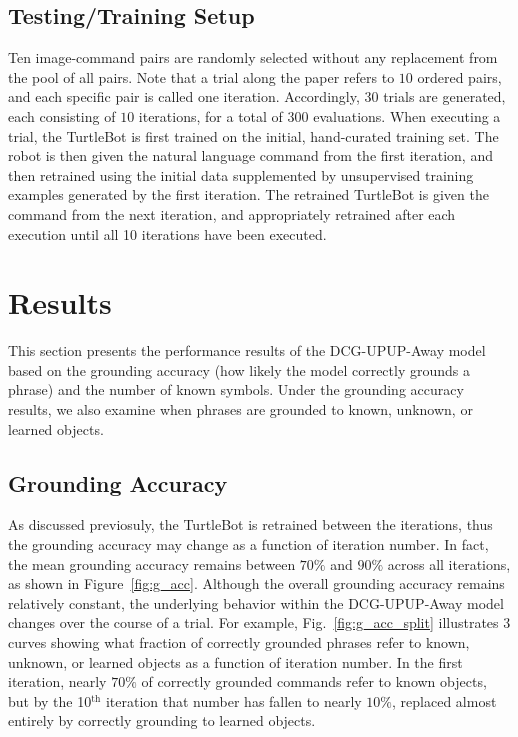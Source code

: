 \subsection{Testing/Training Setup}
Ten image-command pairs are randomly selected without any replacement from the pool of all pairs.
Note that a trial along the paper refers to $10$ ordered pairs, and each specific pair is called one iteration.
Accordingly, $30$ trials are generated, each consisting of $10$ iterations, for a total of $300$ evaluations.
When executing a trial, the TurtleBot is first trained on the initial, hand-curated training set.
The robot is then given the natural language command from the first iteration, and then retrained using the initial data supplemented by unsupervised training examples generated by the first iteration.
The retrained TurtleBot is given the command from the next iteration, and appropriately retrained after each execution until all 10 iterations have been executed.

\section{Results}
This section presents the performance results of the DCG-UPUP-Away model based on the grounding accuracy (how likely the model correctly grounds a phrase) and the number of known symbols.
Under the grounding accuracy results, we also examine when phrases are grounded to known, unknown, or learned objects.
\subsection{Grounding Accuracy}
As discussed previosuly, the TurtleBot is retrained between the iterations, thus the grounding accuracy may change as a function of iteration number. In fact, the mean grounding accuracy remains between $70\%$ and $90\%$ across all iterations, as shown in Figure~\ref{fig:g_acc}. Although the overall grounding accuracy remains relatively constant, the underlying behavior within the DCG-UPUP-Away model changes over the course of a trial. For example, Fig.~\ref{fig:g_acc_split} illustrates 3 curves showing what fraction of correctly grounded phrases refer to known, unknown, or learned objects as a function of iteration number. In the first iteration, nearly $70\%$ of correctly grounded commands refer to known objects, but by the 10$^\text{th}$ iteration that number has fallen to nearly $10\%$, replaced almost entirely by correctly grounding to learned objects.

